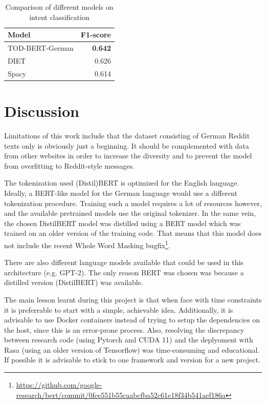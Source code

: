 \documentclass{article}
\begin{document}
\begin{table}
	\begin{tabular}{l r}
		Model & F1-score \\
		\hline
		TOD-BERT-German & \textbf{0.642} \\
		DIET & 0.626 \\
		Spacy & 0.614 \\
	\end{tabular}
\caption{Comparison of different models on intent classification}
\label{tab:intent}
\end{table}

\section{Discussion}

Limitations of this work include that the dataset consisting of German Reddit texts only is obviously just a beginning. It should be complemented with data from other websites in order to increase the diversity and to prevent the model from overfitting to Reddit-style messages.

The tokenization used (Distil)BERT is optimized for the English language. Ideally, a BERT-like model for the German language would use a different tokenization procedure. Training such a model requires a lot of resources however, and the available pretrained models use the original tokenizer. In the same vein, the chosen DistilBERT model was distilled using a BERT model which was trained on an older version of the training code. That means that this model does not include the recent Whole Word Masking bugfix\footnote{\url{https://github.com/google-research/bert/commit/0fce551b55caabcfba52c61e18f34b541aef186a}}.

There are also different language models available that could be used in this architecture (e.g. GPT-2). The only reason BERT was chosen was because a distilled version (DistilBERT) was available.

The main lesson learnt during this project is that when face with time constraints it is preferrable to start with a simple, achievable idea. Additionally, it is advisable to use Docker containers instead of trying to setup the dependencies on the host, since this is an error-prone process. Also, resolving the discrepancy between research code (using Pytorch and CUDA 11) and the deplyoment with Rasa (using an older version of Tensorflow) was time-consuming and educational. If possible it is advisable to stick to one framework and version for a new project.
\end{document}

